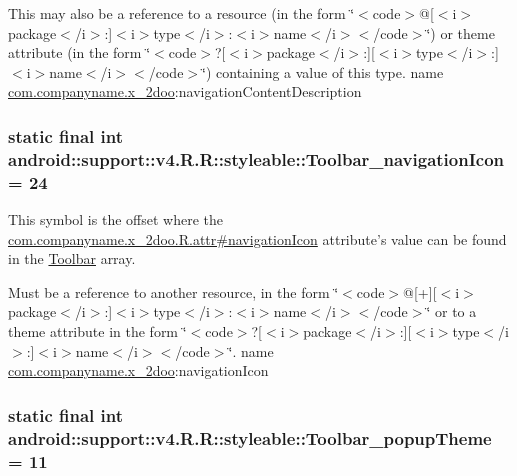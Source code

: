 This may also be a reference to a resource (in the form \char`\"{}$<$code$>$@\mbox{[}$<$i$>$package$<$/i$>$:\mbox{]}$<$i$>$type$<$/i$>$:$<$i$>$name$<$/i$>$$<$/code$>$\char`\"{}) or theme attribute (in the form \char`\"{}$<$code$>$?\mbox{[}$<$i$>$package$<$/i$>$:\mbox{]}\mbox{[}$<$i$>$type$<$/i$>$:\mbox{]}$<$i$>$name$<$/i$>$$<$/code$>$\char`\"{}) containing a value of this type.  name \hyperlink{namespacecom_1_1companyname_1_1x__2doo}{com.companyname.x\_\-2doo}:navigationContentDescription \hypertarget{classandroid_1_1support_1_1v4_1_1_r_1_1styleable_91d5fad8e57cec704e2157d1f6a7b331}{
\subsubsection[{Toolbar\_\-navigationIcon}]{\setlength{\rightskip}{0pt plus 5cm}static final int android::support::v4.R.R::styleable::Toolbar\_\-navigationIcon = 24}}
\label{classandroid_1_1support_1_1v4_1_1_r_1_1styleable_91d5fad8e57cec704e2157d1f6a7b331}


This symbol is the offset where the \hyperlink{classcom_1_1companyname_1_1x__2doo_1_1_r_1_1attr_208dad569cc9e2942b9337ddf6e7df8b}{com.companyname.x\_\-2doo.R.attr\#navigationIcon} attribute's value can be found in the \hyperlink{classandroid_1_1support_1_1v4_1_1_r_1_1styleable_0646d71cfbd4a8645c7d805b33e1c574}{Toolbar} array.

Must be a reference to another resource, in the form \char`\"{}$<$code$>$@\mbox{[}+\mbox{]}\mbox{[}$<$i$>$package$<$/i$>$:\mbox{]}$<$i$>$type$<$/i$>$:$<$i$>$name$<$/i$>$$<$/code$>$\char`\"{} or to a theme attribute in the form \char`\"{}$<$code$>$?\mbox{[}$<$i$>$package$<$/i$>$:\mbox{]}\mbox{[}$<$i$>$type$<$/i$>$:\mbox{]}$<$i$>$name$<$/i$>$$<$/code$>$\char`\"{}.  name \hyperlink{namespacecom_1_1companyname_1_1x__2doo}{com.companyname.x\_\-2doo}:navigationIcon \hypertarget{classandroid_1_1support_1_1v4_1_1_r_1_1styleable_988c9145b755a926e12ec19da469cd62}{
\subsubsection[{Toolbar\_\-popupTheme}]{\setlength{\rightskip}{0pt plus 5cm}static final int android::support::v4.R.R::styleable::Toolbar\_\-popupTheme = 11}}
\label{classandroid_1_1support_1_1v4_1_1_r_1_1styleable_988c9145b755a926e12ec19da469cd62}


